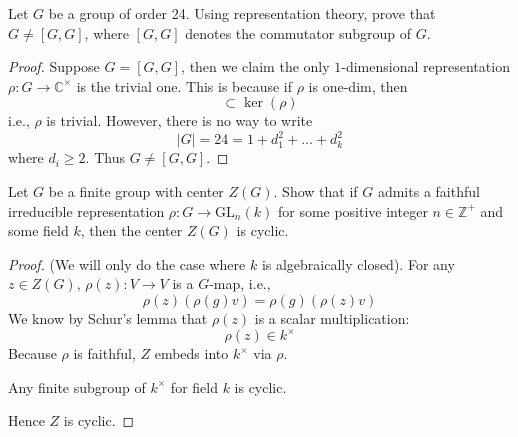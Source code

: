 \begin{prob}[S2010-Q6]
    Let \( G \) be a group of order 24. Using representation theory, prove that \( G \neq [G, G] \), where \([G, G]\) denotes the commutator subgroup of \( G \).
\end{prob}
\begin{proof}
    Suppose $G=[G,G]$, then we claim the only $1$-dimensional representation $\rho:G\to\mathbb{C}^\times$ is the trivial one. This is because if $\rho$ is one-dim, then
    \begin{equation*}
        [G,G]\subset\ker(\rho)
    \end{equation*}
    i.e., $\rho$ is trivial. However, there is no way to write 
    \begin{equation*}
        |G|=24=1+d_1^2+\dots+d_k^2
    \end{equation*}
    where $d_i\geq 2$. Thus $G\neq [G,G]$.
\end{proof}

\begin{prob}[F2017-Q6]
    Let \( G \) be a finite group with center \( Z(G) \). Show that if \( G \) admits a faithful irreducible representation \( \rho \colon G \to \mathrm{GL}_n(k) \) for some positive integer \( n \in \mathbb{Z}^+ \) and some field \( k \), then the center \( Z(G) \) is cyclic.
\end{prob}
\begin{proof}
    (We will only do the case where $k$ is algebraically closed). For any $z\in Z(G)$, $\rho(z): V\to V$ is a $G$-map, i.e., 
    \begin{equation*}
        \rho(z)(\rho(g)v)=\rho(g)(\rho(z)v)
    \end{equation*}
    We know by Schur's lemma that $\rho(z)$ is a scalar multiplication: 
    \begin{equation*}
        \rho(z)\in k^\times
    \end{equation*}
    Because $\rho$ is faithful, $Z$ embeds into $k^\times$ via $\rho$. 
    \begin{lem}[Fact]
        Any finite subgroup of $k^\times$ for field $k$ is cyclic.
    \end{lem}
    Hence $Z$ is cyclic.
\end{proof}



